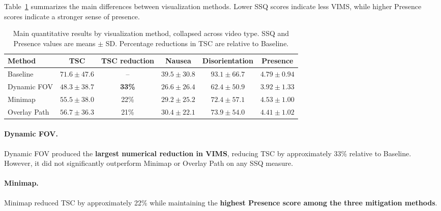 Table~\ref{tab:study1-method-summary} summarizes the main differences between visualization methods. Lower SSQ scores indicate less VIMS, while higher Presence scores indicate a stronger sense of presence.

\begin{table}[t]
    \centering
    \caption{Main quantitative results by visualization method, collapsed across video type. SSQ and Presence values are means $\pm$ SD. Percentage reductions in TSC are relative to Baseline.}
    \label{tab:study1-method-summary}
    \small
    \begin{tabular}{lccccc}
        \toprule
        \textbf{Method}
        & \textbf{TSC}
        & \textbf{TSC reduction}
        & \textbf{Nausea}
        & \textbf{Disorientation}
        & \textbf{Presence} \\
        \midrule

        Baseline
        & $71.6 \pm 47.6$
        & --
        & $39.5 \pm 30.8$
        & $93.1 \pm 66.7$
        & \textbf{$4.79 \pm 0.94$} \\

        Dynamic FOV
        & \textbf{$48.3 \pm 38.7$}
        & \textbf{33\%}
        & \textbf{$26.6 \pm 26.4$}
        & \textbf{$62.4 \pm 50.9$}
        & $3.92 \pm 1.33$ \\

        Minimap
        & $55.5 \pm 38.0$
        & 22\%
        & $29.2 \pm 25.2$
        & $72.4 \pm 57.1$
        & \textbf{$4.53 \pm 1.00$} \\

        Overlay Path
        & $56.7 \pm 36.3$
        & 21\%
        & $30.4 \pm 22.1$
        & $73.9 \pm 54.0$
        & $4.41 \pm 1.02$ \\

        \bottomrule
    \end{tabular}
\end{table}

\paragraph{Dynamic FOV.}
Dynamic FOV produced the \textbf{largest numerical reduction in VIMS}, reducing TSC by approximately 33\% relative to Baseline. However, it did not significantly outperform Minimap or Overlay Path on any SSQ measure.

\paragraph{Minimap.}
Minimap reduced TSC by approximately 22\% while maintaining the \textbf{highest Presence score among the three mitigation methods}.

